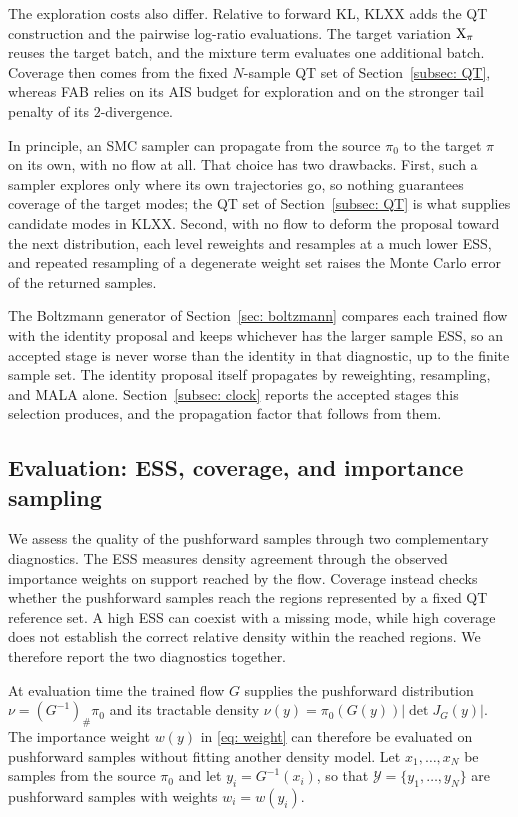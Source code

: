 \documentclass{article}
\begin{document}
The exploration costs also differ. Relative to forward KL, KLXX adds the QT construction and the pairwise log-ratio evaluations. The target variation $\mathrm{X}_\pi$ reuses the target batch, and the mixture term evaluates one additional batch. Coverage then comes from the fixed $N$-sample QT set of Section~\ref{subsec: QT}, whereas FAB relies on its AIS budget for exploration and on the stronger tail penalty of its $2$-divergence.

\begin{remark}
	In principle, an SMC sampler can propagate from the source $\pi_0$ to the target $\pi$ on its own, with no flow at all. That choice has two drawbacks. First, such a sampler explores only where its own trajectories go, so nothing guarantees coverage of the target modes; the QT set of Section~\ref{subsec: QT} is what supplies candidate modes in KLXX. Second, with no flow to deform the proposal toward the next distribution, each level reweights and resamples at a much lower ESS, and repeated resampling of a degenerate weight set raises the Monte Carlo error of the returned samples.
	
	The Boltzmann generator of Section~\ref{sec: boltzmann} compares each trained flow with the identity proposal and keeps whichever has the larger sample ESS, so an accepted stage is never worse than the identity in that diagnostic, up to the finite sample set. The identity proposal itself propagates by reweighting, resampling, and MALA alone. Section~\ref{subsec: clock} reports the accepted stages this selection produces, and the propagation factor that follows from them.
\end{remark}

\subsection{Evaluation: ESS, coverage, and importance sampling}
\label{subsec: eval}

We assess the quality of the pushforward samples through two complementary diagnostics. The ESS measures density agreement through the observed importance weights on support reached by the flow. Coverage instead checks whether the pushforward samples reach the regions represented by a fixed QT reference set. A high ESS can coexist with a missing mode, while high coverage does not establish the correct relative density within the reached regions. We therefore report the two diagnostics together.

At evaluation time the trained flow $G$ supplies the pushforward distribution $\nu=(G^{-1})_{\#}\pi_0$ and its tractable density $\nu(y)=\pi_0(G(y))|\det J_G(y)|$. The importance weight $w(y)$ in \eqref{eq: weight} can therefore be evaluated on pushforward samples without fitting another density model. Let $x_1,\dots,x_N$ be samples from the source $\pi_0$ and let $y_i = G^{-1}(x_i)$, so that $\mathcal Y=\{y_1,\dots,y_N\}$ are pushforward samples with weights $w_i=w(y_i)$.
\end{document}
